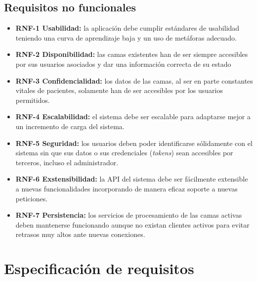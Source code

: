 \subsection{Requisitos no funcionales}\label{requisitos-no-funcionales}
\begin{itemize}
\tightlist
\item
\textbf{RNF-1 Usabilidad:} la aplicación debe cumplir estándares de usabilidad teniendo una curva de aprendizaje baja y un uso de metáforas adecuado.
\item 
\textbf{RNF-2 Disponibilidad:} las camas existentes han de ser siempre accesibles por sus usuarios asociados y dar una información correcta de su estado
\item 
\textbf{RNF-3 Confidencialidad:} los datos de las camas, al ser en parte constantes vitales de pacientes, solamente han de ser accesibles por los usuarios permitidos.
\item
\textbf{RNF-4 Escalabilidad:} el sistema debe ser escalable para adaptarse mejor a un incremento de carga del sistema.
\item 
\textbf{RNF-5 Seguridad:} los usuarios deben poder identificarse sólidamente con el sistema sin que sus datos o sus credenciales (\textit{tokens}) sean accesibles por terceros, incluso el administrador.
\item
\textbf{RNF-6 Exstensibilidad:} la API del sistema debe ser fácilmente extensible a nuevas funcionalidades incorporando de manera eficaz soporte a nuevas peticiones.
\item
\textbf{RNF-7 Persistencia:} los servicios de procesamiento de las camas activas deben mantenerse funcionando aunque no existan clientes activos para evitar retrasos muy altos ante nuevas conexiones.
\end{itemize}

\section{Especificación de requisitos}


